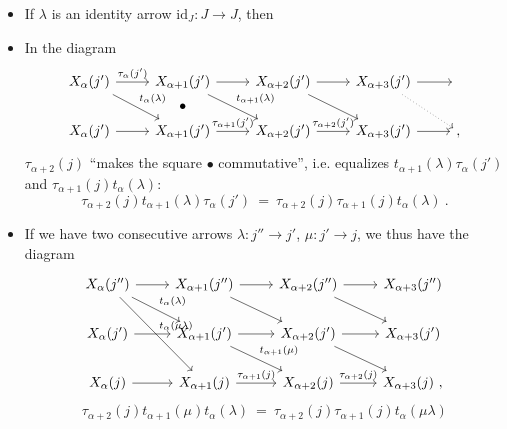\documentclass[11pt]{article}
\begin{document}
\begin{itemize}[leftmargin=3em]
\item[(i)] If $\lambda$ is an identity arrow $\mathrm{id}_J : J\longrightarrow J$, then  %
\item[(ii)] In the diagram
\[
\begin{tikzcd}
X_\alpha(j') \arrow[r,"\tau_\alpha(j')"] \arrow[dr,"t_\alpha(\lambda)"] & X_{\alpha+1}(j') \arrow[r] \arrow[dr,"t_{\alpha+1}(\lambda)"] \arrow[d,phantom,"\bullet"] & X_{\alpha+2}(j') \arrow[r] \arrow[dr] & X_{\alpha+3}(j') \arrow[r] \arrow[dr,dotted] & {} \\
X_\alpha(j') \arrow[r] & X_{\alpha+1}(j') \arrow[r,"\tau_{\alpha+1}(j')"] & X_{\alpha+2}(j') \arrow[r,"\tau_{\alpha+2}(j')"] & X_{\alpha+3}(j') \arrow[r] & {,}
\end{tikzcd}
\] %
$\tau_{\alpha+2}(j)$ ``makes the square $\bullet$ commutative'', i.e. equalizes $t_{\alpha+1}(\lambda)\tau_\alpha(j')$ and $\tau_{\alpha+1}(j)t_\alpha(\lambda)$:
\[
\boxed{\tau_{\alpha+2}(j)t_{\alpha+1}(\lambda)\tau_\alpha(j')\ =\ \tau_{\alpha+2}(j)\tau_{\alpha+1}(j)t_\alpha(\lambda)\ .}
\]
\item[(iii)] If we have two consecutive arrows $\lambda : j''\longrightarrow j'$, $\mu : j'\longrightarrow j$, we thus have the diagram
\[
\begin{tikzcd}
X_\alpha(j'') \arrow[r] \arrow[dr,"t_\alpha(\lambda)"] \arrow[ddr,"t_\alpha(\mu\lambda)"] & X_{\alpha+1}(j'') \arrow[r] \arrow[dr] & X_{\alpha+2}(j'') \arrow[r] \arrow[dr] & X_{\alpha+3}(j'') \\
X_\alpha(j') \arrow[r] & X_{\alpha+1}(j') \arrow[r] \arrow[dr,"t_{\alpha+1}(\mu)"] & X_{\alpha+2}(j') \arrow[r] \arrow[dr] & X_{\alpha+3}(j') \\
X_\alpha(j) \arrow[r] & X_{\alpha+1}(j) \arrow[r,"\tau_{\alpha+1}(j)"] & X_{\alpha+2}(j) \arrow[r,"\tau_{\alpha+2}(j)"] & X_{\alpha+3}(j)\ ,
\end{tikzcd}
\]
\[
\boxed{\tau_{\alpha+2}(j)t_{\alpha+1}(\mu)t_\alpha(\lambda)\ =\ \tau_{\alpha+2}(j)\tau_{\alpha+1}(j)t_\alpha(\mu\lambda)}
\]
\end{itemize}
\end{document}
